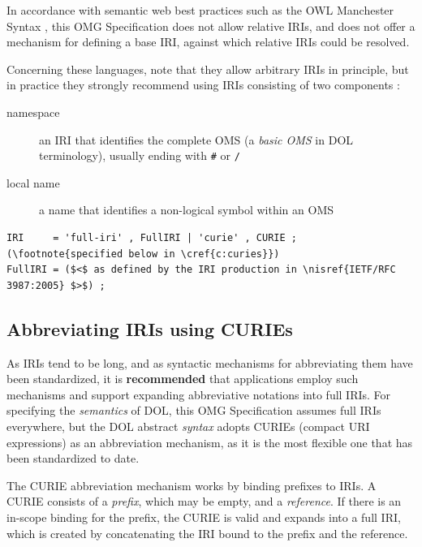 \documentclass[10pt,%
\ifpretendfinal
final%
\else
draft%
\fi,
]{scrreprt}
\newcommand*{\syntax}[1]{\texttt{#1}}
\newcommand*{\recommended}{\textbf{recommended}\xspace}
\newcommand*{\IS}{OMG Specification\xspace}
\newcommand{\clauserefname}{clause}
\newcommand{\cref}[1]{\clauserefname~\ref{#1}}
\newcommand{\ssclause}[1]{\subsection{#1}}
\newcommand{\nisref}[1]{#1}
\begin{document}
In accordance with semantic web best practices such as the OWL Manchester Syntax \cite{W3C:NOTE-owl2-manchester-syntax-20091027}, this \IS does not allow relative IRIs, and does not offer a mechanism for defining a base IRI, against which relative IRIs could be resolved.

Concerning these languages, note that they allow arbitrary IRIs in principle, but in practice they strongly recommend using IRIs consisting of two components \cite{W3C:NOTE-swbp-vocab-pub-20080828}:
\begin{description}
\item[namespace] an IRI that identifies the complete OMS (a \emph{basic OMS} in DOL terminology), usually ending with \syntax{\#} or \syntax{/}
\item[local name] a name that identifies a non-logical symbol within an OMS
\end{description}

\begin{lstlisting}[language=ebnf,escapeinside={()}]  % abstract syntax
IRI     = 'full-iri' , FullIRI | 'curie' , CURIE ; (\footnote{specified below in \cref{c:curies}}) 
FullIRI = ($<$ as defined by the IRI production in \nisref{IETF/RFC 3987:2005} $>$) ;
\end{lstlisting}

\ssclause{Abbreviating IRIs using CURIEs}\label{c:curies}

As IRIs tend to be long, and as syntactic mechanisms for abbreviating them have been standardized, it is \recommended that applications employ such mechanisms and support expanding abbreviative notations into full IRIs.  For specifying the \emph{semantics} of DOL, this \IS assumes full IRIs everywhere, but the DOL abstract \emph{syntax} adopts CURIEs (compact URI expressions) as an abbreviation mechanism, as it is the most flexible one that has been standardized to date.  

The CURIE abbreviation mechanism works by binding prefixes to IRIs.  A CURIE consists of a \emph{prefix}, which may be empty, and a \emph{reference}.  If there is an in-scope binding for the prefix, the CURIE is valid and expands into a full IRI, which is created by concatenating the IRI bound to the prefix and the reference.
\end{document}
